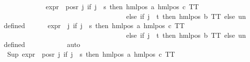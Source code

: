 \begin{isabellebody}
\ \ \ \ \isamarkupfalse%
\isanewline
\isanewline
\ \ \ \ \ \ \isamarkupfalse%
\ {\isachardoublequoteopen}{\isacharparenleft}{\kern0pt}expr{\isacharunderscore}{\kern0pt}{}\ {\isacharbackquote}{\kern0pt}\ {\isacharparenleft}{\kern0pt}pos{\isacharunderscore}{\kern0pt}r\ {\isacharparenleft}{\kern0pt}{\isacharparenleft}{\kern0pt}{\isasymlambda}j{\isachardot}{\kern0pt}\ if\ j\ {\isacharequal}{\kern0pt}\ s\ then\ hml{\isacharunderscore}{\kern0pt}pos\ a\ {\isacharparenleft}{\kern0pt}hml{\isacharunderscore}{\kern0pt}pos\ c\ TT{\isacharparenright}{\kern0pt}\isanewline
\ \ \ \ \ \ \ \ \ \ \ \ \ \ \ \ \ \ \ \ \ \ \ \ \ \ \ \ \ \ \ \ \ \ \ \ else\ if\ j\ {\isacharequal}{\kern0pt}\ t\ then\ hml{\isacharunderscore}{\kern0pt}pos\ b\ TT\ else\ undefined{\isacharparenright}{\kern0pt}\ {\isacharbackquote}{\kern0pt}\ {\isacharbraceleft}{\kern0pt}{\isacharbraceright}{\kern0pt}{\isacharparenright}{\kern0pt}{\isacharparenright}{\kern0pt}{\isacharparenright}{\kern0pt}\ {\isacharequal}{\kern0pt}\ {\isacharbraceleft}{\kern0pt}{\isacharbraceright}{\kern0pt}{\isachardoublequoteclose}\isanewline
\ \ {\isachardoublequoteopen}{\isacharparenleft}{\kern0pt}{\isacharparenleft}{\kern0pt}expr{\isacharunderscore}{\kern0pt}{}\ {\isasymcirc}\ {\isacharparenleft}{\kern0pt}{\isasymlambda}j{\isachardot}{\kern0pt}\ if\ j\ {\isacharequal}{\kern0pt}\ s\ then\ hml{\isacharunderscore}{\kern0pt}pos\ a\ {\isacharparenleft}{\kern0pt}hml{\isacharunderscore}{\kern0pt}pos\ c\ TT{\isacharparenright}{\kern0pt}\isanewline
\ \ \ \ \ \ \ \ \ \ \ \ \ \ \ \ \ \ \ \ \ \ \ \ \ \ \ \ \ \ \ \ \ \ \ \ else\ if\ j\ {\isacharequal}{\kern0pt}\ t\ then\ hml{\isacharunderscore}{\kern0pt}pos\ b\ TT\ else\ undefined{\isacharparenright}{\kern0pt}{\isacharparenright}{\kern0pt}\ {\isacharbackquote}{\kern0pt}\ {\isacharbraceleft}{\kern0pt}{\isacharbraceright}{\kern0pt}{\isacharparenright}{\kern0pt}\ {\isacharequal}{\kern0pt}\ {\isacharbraceleft}{\kern0pt}{\isacharbraceright}{\kern0pt}{\isachardoublequoteclose}\isanewline
\ \ \ \ \ \ \isamarkupfalse%
\ auto\isanewline
\ \ \ \ \isamarkupfalse%
\ {\isachardoublequoteopen}Sup\ {\isacharparenleft}{\kern0pt}expr{\isacharunderscore}{\kern0pt}{}\ {\isacharbackquote}{\kern0pt}\ {\isacharparenleft}{\kern0pt}pos{\isacharunderscore}{\kern0pt}r\ {\isacharparenleft}{\kern0pt}{\isacharparenleft}{\kern0pt}{\isasymlambda}j{\isachardot}{\kern0pt}\ if\ j\ {\isacharequal}{\kern0pt}\ s\ then\ hml{\isacharunderscore}{\kern0pt}pos\ a\ {\isacharparenleft}{\kern0pt}hml{\isacharunderscore}{\kern0pt}pos\ c\ TT{\isacharparenright}{\kern0pt}\isanewline

\end{isabellebody}
